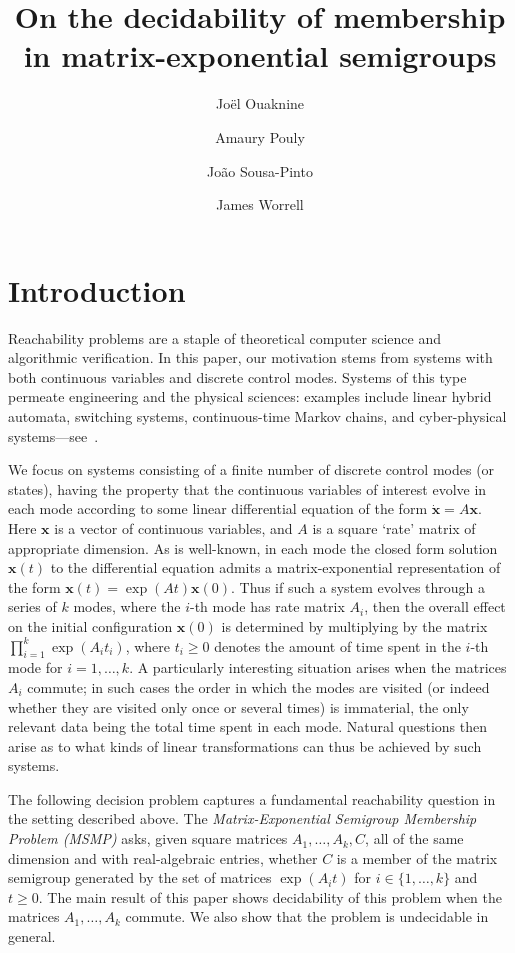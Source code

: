 \documentclass[format=acmsmall, review=false, screen=true]{acmart}
\title{On the decidability of membership in matrix-exponential semigroups}
\author{Jo\"{e}l Ouaknine}
\author{Amaury Pouly}
\affiliation{
    \institution{Max Planck Institute for Software Systems}
}
\author{Jo\~{a}o Sousa-Pinto}
\author{James Worrell}
\affiliation{
    \institution{University of Oxford}
}
\newcommand{\myvector}{\boldsymbol}
\begin{document}
\maketitle

\section{Introduction}
Reachability problems are a staple of theoretical computer science and
algorithmic verification. In this paper, our motivation stems from
systems with both continuous variables and discrete control modes.
Systems of this type permeate engineering and the physical sciences:
examples include linear hybrid automata, switching systems,
continuous-time Markov chains, and cyber-physical
systems---see~\cite{Alu15,HenzingerSTOC,HenzingerLICS,AsarinMPS12}.

We focus on systems consisting of a finite number of discrete
control modes (or states), having the property that the continuous
variables of interest evolve in each mode according to some linear
differential equation of the form $\dot{\myvector{x}} = A
\myvector{x}$.  Here $\myvector{x}$ is a vector of continuous
variables, and $A$ is a square `rate' matrix of appropriate dimension.
As is well-known, in each mode the closed form solution
$\myvector{x}(t)$ to the differential equation admits a
matrix-exponential representation of the form $\myvector{x}(t) =
\exp(At)\myvector{x}(0)$. Thus if such a system evolves through a
series of $k$ modes, where the $i$-th mode has rate matrix
$A_i$, then the overall effect on the initial configuration
$\myvector{x}(0)$ is determined by multiplying by the matrix $\prod
\limits_{i=1}^{k} \exp(A_{i} t_{i})$, where $t_i\geq 0$ denotes the
amount of time spent in the $i$-th mode for $i=1,\ldots,k$.  A
particularly interesting situation arises when the matrices $A_i$
commute; in such cases the order in which the
modes are visited (or indeed whether they are visited only once or
several times) is immaterial, the only relevant data being the total
time spent in each mode. Natural questions then arise as to what
kinds of linear transformations can thus be achieved by such systems.

The following decision problem captures a fundamental reachability
question in the setting described above.  The \emph{Matrix-Exponential
  Semigroup Membership Problem (MSMP)} asks, given square matrices
$A_{1}, \ldots, A_{k},C$, all of the same dimension and with
real-algebraic entries, whether $C$ is a member of the matrix
semigroup generated by the set of matrices $\exp(A_i t)$ for
$i\in\{1,\ldots,k\}$ and $t\geq 0$.  The main result of this paper
shows decidability of this problem when the matrices $A_{1}, \ldots,
A_{k}$ commute.  We also show that the problem is undecidable in
general.
\end{document}
